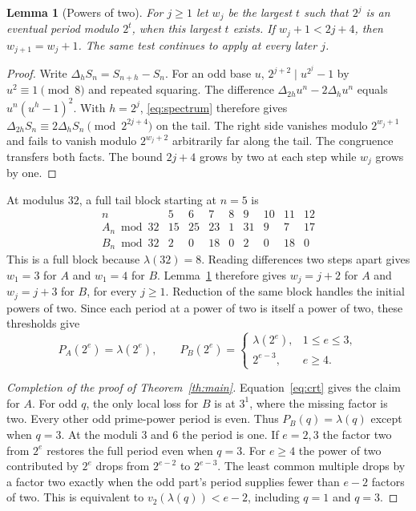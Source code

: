 \documentclass[11pt,letterpaper]{article}
\newtheorem{lemma}[theorem]{Lemma}
\begin{document}
\begin{lemma}[Powers of two]\label{lem:two}
For $j\ge1$ let $w_j$ be the largest $t$ such that $2^j$ is an eventual
period modulo $2^t$, when this largest $t$ exists. If $w_j+1<2j+4$, then
$w_{j+1}=w_j+1$. The same test continues to apply at every later $j$.
\end{lemma}

\begin{proof}
Write $\Delta_h S_n=S_{n+h}-S_n$. For an odd base $u$,
$2^{j+2}\mid u^{2^j}-1$ by $u^2\equiv1\pmod8$ and repeated squaring.
The difference $\Delta_{2h}u^n-2\Delta_hu^n$ equals
$u^n(u^h-1)^2$. With $h=2^j$, \eqref{eq:spectrum} therefore gives
$\Delta_{2h}S_n\equiv2\Delta_hS_n\pmod{2^{2j+4}}$ on the tail.
The right side vanishes modulo $2^{w_j+1}$ and fails to vanish modulo
$2^{w_j+2}$ arbitrarily far along the tail. The congruence transfers both
facts. The bound $2j+4$ grows by two at each step while $w_j$ grows by one.
\end{proof}

At modulus $32$, a full tail block starting at $n=5$ is
\[
\begin{array}{c|rrrrrrrr}
 n&5&6&7&8&9&10&11&12\\\hline
 A_n\bmod32&15&25&23&1&31&9&7&17\\
 B_n\bmod32& 2& 0&18&0& 2&0&18& 0
\end{array}
\]
This is a full block because $\lambda(32)=8$. Reading differences two
steps apart gives $w_1=3$ for $A$ and $w_1=4$ for $B$. Lemma~\ref{lem:two}
therefore gives $w_j=j+2$ for $A$ and $w_j=j+3$ for $B$, for every $j\ge1$.
Reduction of the same block handles the initial powers of two. Since each
period at a power of two is itself a power of two, these thresholds give
\[
 P_A(2^e)=\lambda(2^e),\qquad
 P_B(2^e)=
 \begin{cases}
 \lambda(2^e),&1\le e\le3,\\
 2^{e-3},&e\ge4 .
 \end{cases}
\]

\begin{proof}[Completion of the proof of Theorem~\ref{th:main}]
Equation~\eqref{eq:crt} gives the claim for $A$. For odd $q$, the only
local loss for $B$ is at $3^1$, where the missing factor is two. Every
other odd prime-power period is even. Thus $P_B(q)=\lambda(q)$ except when
$q=3$. At the moduli $3$ and $6$ the period is one. If $e=2,3$ the factor
two from $2^e$ restores the full period even when $q=3$. For $e\ge4$ the
power of two contributed by $2^e$ drops from $2^{e-2}$ to $2^{e-3}$.
The least common multiple drops by a factor two exactly when the odd
part's period supplies fewer than $e-2$ factors of two. This is equivalent
to $v_2(\lambda(q))<e-2$, including $q=1$ and $q=3$.
\end{proof}
\end{document}
